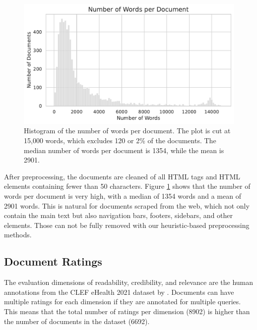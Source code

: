 \begin{figure}[tb]
\centering
\includegraphics[width=\textwidth]{images/num_words_per_passage.pdf}
\caption{Histogram of the number of words per document. The plot is cut at 15,000 words, which excludes 120 or 2\% of the documents. The median number of words per document is 1354, while the mean is 2901.}
\label{fig:num_words_per_document}
\end{figure}
After preprocessing, the documents are cleaned of all HTML tags and HTML elements containing fewer than 50 characters.
Figure \ref{fig:num_words_per_document} shows that the number of words per document is very high, with a median of 1354 words and a mean of 2901 words.
This is natural for documents scraped from the web, which not only contain the main text but also navigation bars, footers, sidebars, and other elements.
Those can not be fully removed with our heuristic-based preprocessing methods.
\subsection{Document Ratings}
The evaluation dimensions of readability, credibility, and relevance are the human annotations from the CLEF eHealth 2021 dataset by \cite{goeuriot:2021:Consumer}.
Documents can have multiple ratings for each dimension if they are annotated for multiple queries.
This means that the total number of ratings per dimension (8902) is higher than the number of documents in the dataset (6692).


